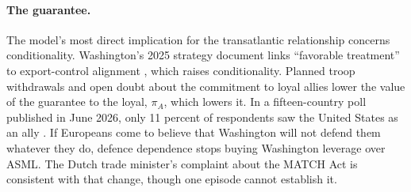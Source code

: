\paragraph{The guarantee.} The model's most direct implication for the transatlantic relationship concerns conditionality. Washington's 2025 strategy document links ``favorable treatment'' to export-control alignment \citep{whitehouse2025nss}, which raises conditionality. Planned troop withdrawals and open doubt about the commitment to loyal allies lower the value of the guarantee to the loyal, $\pi_A$, which lowers it. In a fifteen-country poll published in June 2026, only 11 percent of respondents saw the United States as an ally \citep{ecfr2026home}. If Europeans come to believe that Washington will not defend them whatever they do, defence dependence stops buying Washington leverage over ASML. The Dutch trade minister's complaint about the MATCH Act is consistent with that change, though one episode cannot establish it.
